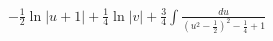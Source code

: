 \documentclass[preview]{standalone}
\begin{document}
\begin{align*}
-\frac{1}{2}\ln|u+1|+\frac{1}{4}\ln|v|+\frac{3}{4}\int\frac{du}{(u^2-\frac{1}{2})^2-\frac{1}{4}+1}
\end{align*}
\end{document}
